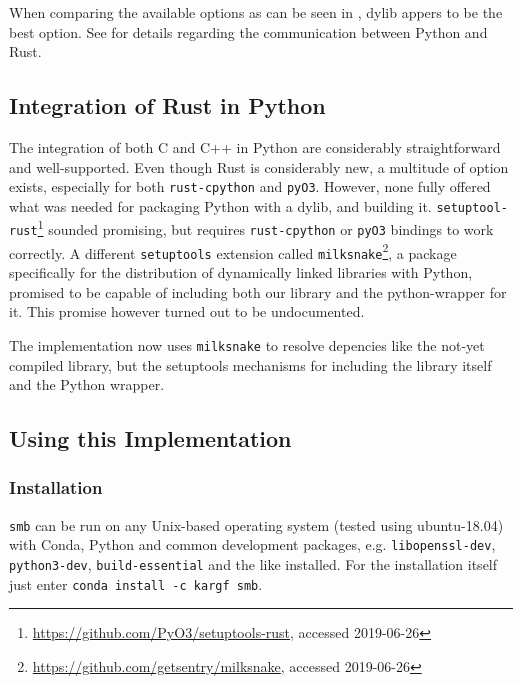 When comparing the available options as can be seen in ,
dylib appers to be the best option. See  for details
regarding the communication between Python and Rust. 


\subsection{Integration of Rust in Python}\label{sec:integration}


The integration of both C and C++ in Python are considerably straightforward
and well-supported. Even though Rust is considerably new, a multitude of option
exists, especially for both \verb|rust-cpython| and \verb|pyO3|. However, none
fully offered what was needed for packaging Python with a dylib, and building
it.
\verb|setuptool-rust|\footnote{\url{https://github.com/PyO3/setuptools-rust},
accessed 2019-06-26} sounded promising, but requires \verb|rust-cpython| or
\verb|pyO3| bindings to work correctly. A different \verb|setuptools| extension
called \verb|milksnake|\footnote{\url{https://github.com/getsentry/milksnake},
accessed 2019-06-26}, a package specifically for the distribution of
dynamically linked libraries with Python, promised to be capable of including
both our library and the python-wrapper for it. This promise however turned out
to be undocumented.

The implementation now uses \verb|milksnake| to resolve depencies like the
not-yet compiled library, but the setuptools mechanisms for including the
library itself and the Python wrapper.




\subsection{Using this Implementation}\label{sec:using}

\subsubsection{Installation}\label{sec:install}


\verb|smb| can be run on any Unix-based operating system (tested using ubuntu-18.04)
with Conda, Python and common development packages, e.g.
\verb!libopenssl-dev!, \verb!python3-dev!, \verb!build-essential! and the like
installed. For the installation itself just enter \verb|conda install -c kargf smb|.

